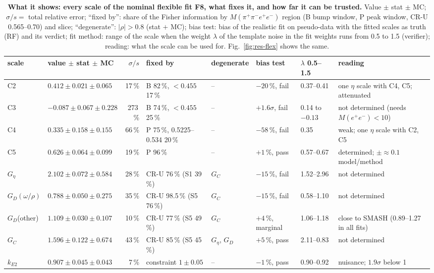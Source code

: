 \documentclass[11pt,a4paper]{article}
\newcommand{\Mfour}{\ensuremath{M(\pi^{+}\pi^{-}e^{+}e^{-})}\xspace}
\newcommand{\Mee}{\ensuremath{M(e^{+}e^{-})}\xspace}
\newcommand{\kEtwo}{\ensuremath{k_{E2}}\xspace}
\newcommand{\Geta}{\ensuremath{G_\eta}\xspace}
\begin{document}
\begin{table}[!htb]
\centering
\caption{\textbf{What it shows: every scale of the nominal flexible fit F8, what fixes it, and how far it can be trusted.} Value $\pm$ stat $\pm$ MC;
$\sigma/s=$ total relative error; ``fixed by'': share of the Fisher information by \Mfour region (B bump window, P peak window, CR-U 0.565--0.70)
and slice; ``degenerate'': $|\rho|>0.8$ (stat $+$ MC); bias test: bias of the realistic fit on pseudo-data with the fitted scales as truth (RF) and
its verdict; fit method: range of the scale when the weight $\lambda$ of the template noise in the fit weights runs from 0.5 to 1.5 (verifier);
reading: what the scale can be used for. Fig.~\ref{fig:res-flex} shows the same.}
\label{tab:flex-scales}
\footnotesize
\setlength{\tabcolsep}{2.5pt}
\begin{tabularx}{\textwidth}{@{}l l r >{\raggedright\arraybackslash}p{2.35cm} l >{\raggedright\arraybackslash}p{1.6cm} l L@{}}
\toprule
scale & value $\pm$ stat $\pm$ MC & $\sigma/s$ & fixed by & degenerate & bias test & $\lambda$ 0.5--1.5 & reading \\
\midrule
C2 & $0.412\pm0.021\pm0.065$ & 17\,\% & B 82\,\%, $<0.455$ 17\,\% & -- & $-20$\,\%, fail & 0.37--0.41 & one $\eta$ scale with C4, C5; attenuated \\
C3 & $-0.087\pm0.067\pm0.228$ & 273\,\% & B 74\,\%, $<0.455$ 25\,\% & -- & $+1.6\sigma$, fail & 0.14 to $-0.13$ & not determined (needs \Mee$<10$) \\
C4 & $0.335\pm0.158\pm0.155$ & 66\,\% & P 75\,\%, 0.5225--0.534 20\,\% & -- & $-58$\,\%, fail & 0.35 & weak; one $\eta$ scale with C2, C5 \\
C5 & $0.626\pm0.064\pm0.099$ & 19\,\% & P 96\,\% & -- & $+1$\,\%, pass & 0.57--0.67 & determined; $\pm{\approx}0.1$ model/method \\
\Geta & $2.102\pm0.072\pm0.584$ & 28\,\% & CR-U 76\,\% (S1 39\,\%) & $G_C$ & $-15$\,\%, fail & 1.52--2.96 & not determined \\
$G_D(\omega/\rho)$ & $0.788\pm0.050\pm0.275$ & 35\,\% & CR-U 98.5\,\% (S5 76\,\%) & $G_C$ & $-15$\,\%, fail & 0.58--1.10 & not determined \\
$G_D$(other) & $1.109\pm0.030\pm0.107$ & 10\,\% & CR-U 77\,\% (S5 49\,\%) & $G_C$ & $+4$\,\%, marginal & 1.06--1.18 & close to SMASH (0.89--1.27 in all fits) \\
$G_C$ & $1.596\pm0.122\pm0.674$ & 43\,\% & CR-U 85\,\% (S5 45\,\%) & \Geta, $G_D$ & $+5$\,\%, pass & 2.11--0.83 & not determined \\
\kEtwo & $0.907\pm0.045\pm0.043$ & 7\,\% & constraint $1\pm0.05$ & -- & $-1$\,\%, pass & 0.90--0.92 & nuisance; $1.9\sigma$ below 1 \\
\bottomrule
\end{tabularx}
\end{table}
\end{document}
